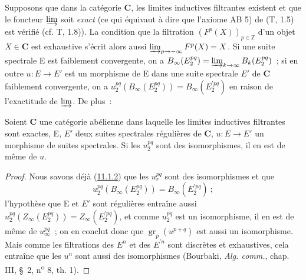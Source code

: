 \begin{env}[11.1.4]
\label{0.11.1.4-fr}
Supposons que dans la catégorie $\boldsymbol{C}$, les limites inductives filtrantes
existent et que le foncteur $\varinjlim$ soit \emph{exact} (ce qui équivaut à
dire que l'axiome AB 5) de (T, 1.5) est vérifié (cf. T, 1.8)). La condition
que la filtration $(F^p(X))_{p\in\mathbb Z}$ d'un objet $X\in\boldsymbol{C}$ est
exhaustive s'écrit alors aussi
$\varinjlim_{p\to-\infty}F^p(X)=X$. Si une suite spectrale E est faiblement
convergente, on a
$B_\infty(E_2^{pq})=\varinjlim_{k\to\infty}B_k(E_2^{pq})$~; si en outre
$u:E\to E'$ est un morphisme de E dans une suite spectrale $E'$ de
$\boldsymbol{C}$ faiblement convergente, on a
$u_2^{pq}(B_\infty(E_2^{pq}))=B_\infty(E_2^{\prime pq})$ en raison de
l'exactitude de $\varinjlim$. De plus~:
\end{env}

\begin{proposition}[11.1.5]
\label{0.11.1.5-fr}
Soient $\mathbf{C}$ une catégorie abélienne dans laquelle les limites
inductives filtrantes sont exactes, \textup{E}, $E'$ deux suites spectrales régulières
de $\mathbf{C}$, $u:E\to E'$ un morphisme de suites spectrales. Si les
$u_2^{pq}$ sont des isomorphismes, il en est de même de $u$.
\end{proposition}

\begin{proof}
Nous savons déjà (\hyperref[0.11.1.2-fr]{11.1.2}) que les $u_r^{pq}$ sont des
isomorphismes et que
\[
  u_2^{pq}(B_\infty(E_2^{pq}))=B_\infty(E_2^{\prime pq})~;
\]
l'hypothèse que E et $E'$ sont régulières entraîne aussi
$u_2^{pq}(Z_\infty(E_2^{pq}))=Z_\infty(E_2^{\prime pq})$, et comme
$u_2^{pq}$ est un isomorphisme, il en est de même de $u_\infty^{pq}$~; on en
conclut donc que $\operatorname{gr}_p(u^{p+q})$ est aussi un isomorphisme.
Mais comme les filtrations des $E^n$ et des $E^{\prime n}$ sont discrètes et
exhaustives, cela entraîne que les $u^n$ sont aussi des isomorphismes
(Bourbaki, \emph{Alg. comm.}, chap. III, \S~2, n\textsuperscript{o} 8,
th. 1).
\end{proof}

